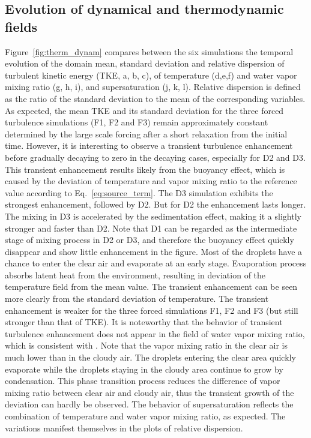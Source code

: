 \documentclass[draft,linenumbers]{AGUJournal}
\newcommand{\Eq}[1]{Eq.~\eqref{#1}} \newcommand{\Fig}[1]{Figure~\ref{#1}}
\begin{document}
\subsection{Evolution of dynamical and thermodynamic fields}
\Fig{fig:therm_dynam} compares between the six simulations the temporal evolution of the domain mean, standard deviation and relative dispersion of turbulent kinetic energy (TKE, a, b, c), of temperature (d,e,f) and water vapor mixing ratio (g, h, i), and supersaturation (j, k, l). Relative dispersion is defined as the ratio of the standard deviation to the mean of the corresponding variables. As expected, the mean TKE and its standard deviation for the three forced turbulence simulations (F1, F2 and F3) remain approximately constant determined by the large scale forcing after a short relaxation from the initial time. However, it is interesting to observe a transient turbulence enhancement before gradually decaying to zero in the decaying cases, especially for D2 and D3. This transient enhancement results likely from the buoyancy effect, which is caused by the deviation of temperature and vapor mixing ratio to the reference value according to \Eq{eq:source_term}. The D3 simulation exhibits the strongest enhancement, followed by D2. But for D2 the enhancement lasts longer. The mixing in D3 is accelerated by the sedimentation effect, making it a slightly stronger and faster than D2. Note that D1 can be regarded as the intermediate stage of mixing process in D2 or D3, and therefore the buoyancy effect quickly disappear and show little enhancement in the figure.  Most of the droplets have a chance to enter the clear air and evaporate at an early stage. Evaporation process absorbs latent heat from the environment, resulting in deviation of the temperature field from the mean value. The transient enhancement can be seen more clearly from the standard deviation of temperature. The transient enhancement is weaker for the three forced simulations F1, F2 and F3 (but still stronger than that of TKE).  It is noteworthy that the behavior of transient turbulence enhancement does not appear in the field of water vapor mixing ratio, which is consistent with \citet{Kumar14}. Note that the vapor mixing ratio in the clear air is much lower than in the cloudy air. The droplets entering the clear area quickly evaporate while the droplets staying in the cloudy area continue to grow by condensation. This phase transition process reduces the difference of vapor mixing ratio between clear air and cloudy air, thus the transient growth of the deviation can hardly be observed.  The behavior of supersaturation reflects the combination of temperature and water vapor mixing ratio, as expected. The variations manifest themselves in the plots of relative dispersion.
\end{document}
